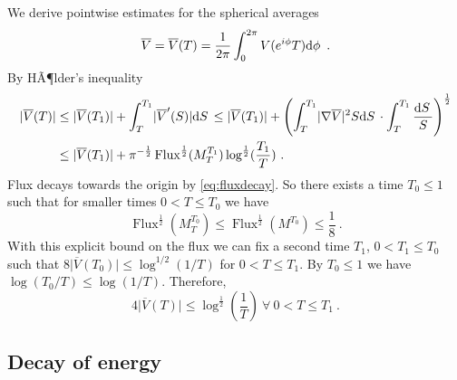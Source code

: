 \documentclass[a4paper]{amsart}
\providecommand{\abs}[1]{\lvert #1 \rvert}
\providecommand{\dint}[1]{ {\rm d} #1\,}
\begin{document}
We derive pointwise estimates for the spherical averages
\begin{equation*}
  \overline{V} = \overline{V}(T) = \frac{1}{2 \pi} \int_0^{2 \pi} V(e^{i \phi} T)
  \dint{\phi}\ .
\end{equation*}
By HÃ¶lder's inequality
\begin{equation*}
  \begin{split}
    \abs{\overline{V}(T)}
    &\leq
    \abs{\overline{V}(T_1)}
    +
    \int_T^{T_1} \abs{\overline{V}'(S)} \dint{S}
    \leq
    \abs{\overline{V}(T_1)}
    +
    \left(
    \int_T^{T_1}
    \abs{\nabla \overline{V}}^2 S
    \dint{S}
    \cdot
    \int_T^{T_1}
    \frac{\dint{S}}{S}
    \right)^{\frac{1}{2}} \\
    &\leq
    \abs{\overline{V}(T_1)}
    +
    \pi^{-\frac{1}{2}} \operatorname{Flux}^{\frac{1}{2}}(M_T^{T_1})
    \log^{\frac{1}{2}}(\frac{T_1}{T}) \ .
  \end{split}
\end{equation*}
Flux decays towards the origin by \eqref{eq:fluxdecay}. So there exists a time
$T_0 \leq 1$ such that for smaller times $0 < T \leq T_0$ we have
\begin{equation*}
  \operatorname{Flux}^{\frac{1}{2}}(M_T^{T_0})
  \leq
  \operatorname{Flux}^{\frac{1}{2}}(M^{T_0})
  \leq
  \frac{1}{8} \ .
\end{equation*}
With this explicit bound on the flux we can fix a second time $T_1$, $0 < T_1
\leq T_0$ such that $8 \abs{\overline{V}(T_0)} \leq \log^{1/2}(1/T)$ for $0 <
T \leq T_1$. By $T_0 \leq 1$ we have $\log(T_0 / T) \leq \log(1 / T)$.
Therefore,
\begin{equation}
  4 \abs{\overline{V}(T)} \leq \log^{\frac{1}{2}}(\frac{1}{T}) \ \forall\ 0 <
  T \leq T_1 \ .
  \label{eq:pointwiseboundonaverage}
\end{equation}

\subsection{Decay of energy}
\end{document}
